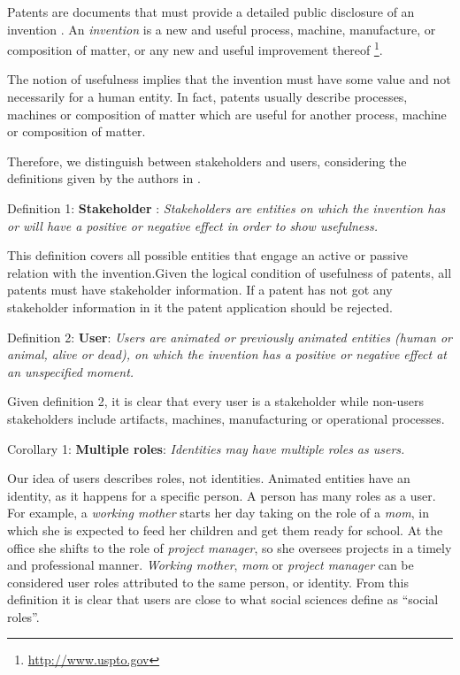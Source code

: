 \documentclass[]{book}
\let\rmarkdownfootnote\footnote%
\def\footnote{\protect\rmarkdownfootnote}
\theoremstyle{definition}
\theoremstyle{definition}
\theoremstyle{definition}
\theoremstyle{remark}
\begin{document}
Patents are documents that must provide a detailed public disclosure of
an invention \citep{wipo2}. An \emph{invention} is a new and useful
process, machine, manufacture, or composition of matter, or any new and
useful improvement thereof \footnote{\url{http://www.uspto.gov}}.

The notion of usefulness implies that the invention must have some value
and not necessarily for a human entity. In fact, patents usually
describe processes, machines or composition of matter which are useful
for another process, machine or composition of matter.

Therefore, we distinguish between stakeholders and users, considering
the definitions given by the authors in \citep{bonam2017}.

Definition 1: \textbf{Stakeholder} : \emph{Stakeholders are entities on
which the invention has or will have a positive or negative effect in
order to show usefulness.}

This definition covers all possible entities that engage an active or
passive relation with the invention.Given the logical condition of
usefulness of patents, all patents must have stakeholder information. If
a patent has not got any stakeholder information in it the patent
application should be rejected.

Definition 2: \textbf{User}: \emph{Users are animated or previously
animated entities (human or animal, alive or dead), on which the
invention has a positive or negative effect at an unspecified moment.}

Given definition 2, it is clear that every user is a stakeholder while
non-users stakeholders include artifacts, machines, manufacturing or
operational processes.

Corollary 1: \textbf{Multiple roles}: \emph{Identities may have multiple
roles as users.}

Our idea of users describes roles, not identities. Animated entities
have an identity, as it happens for a specific person. A person has many
roles as a user. For example, a \emph{working mother} starts her day
taking on the role of a \emph{mom}, in which she is expected to feed her
children and get them ready for school. At the office she shifts to the
role of \emph{project manager}, so she oversees projects in a timely and
professional manner. \emph{Working mother}, \emph{mom} or \emph{project
manager} can be considered user roles attributed to the same person, or
identity. From this definition it is clear that users are close to what
social sciences define as ``social roles''.
\end{document}

